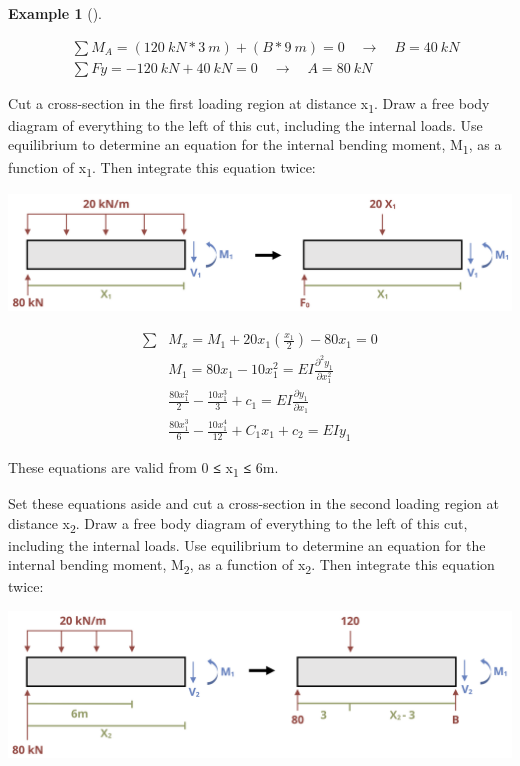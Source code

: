 \documentclass[
  letterpaper,
  DIV=11,
  numbers=noendperiod]{scrreprt}
\theoremstyle{definition}
\newtheorem{example}{Example}[chapter]
\theoremstyle{remark}
\begin{document}
\begin{tcolorbox}
\begin{example}[]
\begin{tcolorbox}
\[
\begin{aligned}
& \sum M_A=(120{~kN}*3{~m})+(B*9{~m})=0 \quad \rightarrow \quad B=40{~kN} \\
& \sum F y=-120{~kN}+40{~kN}=0 \quad \rightarrow \quad A=80{~kN}
\end{aligned}
\]

Cut a cross-section in the first loading region at distance
x\textsubscript{1}. Draw a free body diagram of everything to the left
of this cut, including the internal loads. Use equilibrium to determine
an equation for the internal bending moment, M\textsubscript{1}, as a
function of x\textsubscript{1}. Then integrate this equation twice:

\begin{center}
\includegraphics{images/CH11 PNGs/example11.3-3.png}
\end{center}

\[
\begin{aligned}
\sum &M_x=M_1+20 x_1\left(\frac{x_1}{2}\right)-80 x_1=0 \\
&M_1=80 x_1-10 x_1^2=E I \frac{\partial^2 y_1}{\partial x_1^2} \\ 
&\frac{80 x_1^2}{2}-\frac{10 x_1^3}{3}+c_1=E I \frac{\partial y_1}{\partial x_1} \\
&\frac{80 x_1^3}{6}-\frac{10 x_1^4}{12}+C_1 x_1+c_2=E I y_1
\end{aligned}
\]

These equations are valid from 0 \textbf{≤} x\textsubscript{1}
\textbf{≤} 6m.

Set these equations aside and cut a cross-section in the second loading
region at distance x\textsubscript{2}. Draw a free body diagram of
everything to the left of this cut, including the internal loads. Use
equilibrium to determine an equation for the internal bending moment,
M\textsubscript{2}, as a function of x\textsubscript{2}. Then integrate
this equation twice:

\begin{center}
\includegraphics{images/CH11 PNGs/example11.3-4.png}
\end{center}


\end{tcolorbox}
\end{example}
\end{tcolorbox}
\end{document}
